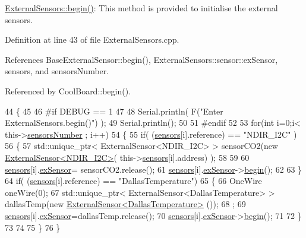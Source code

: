 \hyperlink{classExternalSensors_a58ede0d786a86417254708870f04a21e}{External\+Sensors\+::begin()}\+: This method is provided to initialise the external sensors. 

Definition at line 43 of file External\+Sensors.\+cpp.



References Base\+External\+Sensor\+::begin(), External\+Sensors\+::sensor\+::ex\+Sensor, sensors, and sensors\+Number.



Referenced by Cool\+Board\+::begin().


\begin{DoxyCode}
44 \{
45 
46 \textcolor{preprocessor}{#if DEBUG == 1}
47 
48     Serial.println( F(\textcolor{stringliteral}{"Enter ExternalSensors.begin()"}) );
49     Serial.println();
50 
51 \textcolor{preprocessor}{#endif }
52 
53     \textcolor{keywordflow}{for}(\textcolor{keywordtype}{int} i=0;i< this->\hyperlink{classExternalSensors_a58e4fbf9adeae787d92be5fa33043b5d}{sensorsNumber} ; i++)
54     \{
55         \textcolor{keywordflow}{if}( (\hyperlink{classExternalSensors_a284233f884fcf00154a44740cf1d9e1e}{sensors}[i].reference) == \textcolor{stringliteral}{"NDIR\_I2C"} )
56         \{   
57             std::unique\_ptr< ExternalSensor<NDIR\_I2C> > sensorCO2(\textcolor{keyword}{new} 
      \hyperlink{classExternalSensor_3_01NDIR__I2C_01_4}{ExternalSensor<NDIR\_I2C>}( this->\hyperlink{classExternalSensors_a284233f884fcf00154a44740cf1d9e1e}{sensors}[i].address) );
58 
59 
60             \hyperlink{classExternalSensors_a284233f884fcf00154a44740cf1d9e1e}{sensors}[i].\hyperlink{structExternalSensors_1_1sensor_a9bca150fd468b8d0e090e6d72c5c2b48}{exSensor}= sensorCO2.release();
61             \hyperlink{classExternalSensors_a284233f884fcf00154a44740cf1d9e1e}{sensors}[i].\hyperlink{structExternalSensors_1_1sensor_a9bca150fd468b8d0e090e6d72c5c2b48}{exSensor}->\hyperlink{classBaseExternalSensor_a87d132803d4f4fdd4e66332809f0c9a0}{begin}();
62 
63         \}
64         \textcolor{keywordflow}{if}( (\hyperlink{classExternalSensors_a284233f884fcf00154a44740cf1d9e1e}{sensors}[i].reference) == \textcolor{stringliteral}{"DallasTemperature"})
65         \{
66             OneWire oneWire(0);
67             std::unique\_ptr< ExternalSensor<DallasTemperature> > dallasTemp(\textcolor{keyword}{new} 
      \hyperlink{classExternalSensor_3_01DallasTemperature_01_4}{ExternalSensor<DallasTemperature>} ());
68              ;
69             \hyperlink{classExternalSensors_a284233f884fcf00154a44740cf1d9e1e}{sensors}[i].\hyperlink{structExternalSensors_1_1sensor_a9bca150fd468b8d0e090e6d72c5c2b48}{exSensor}=dallasTemp.release();
70             \hyperlink{classExternalSensors_a284233f884fcf00154a44740cf1d9e1e}{sensors}[i].\hyperlink{structExternalSensors_1_1sensor_a9bca150fd468b8d0e090e6d72c5c2b48}{exSensor}->\hyperlink{classBaseExternalSensor_a87d132803d4f4fdd4e66332809f0c9a0}{begin}();
71             
72         \}
73         
74         
75     \}
76 \}
\end{DoxyCode}
